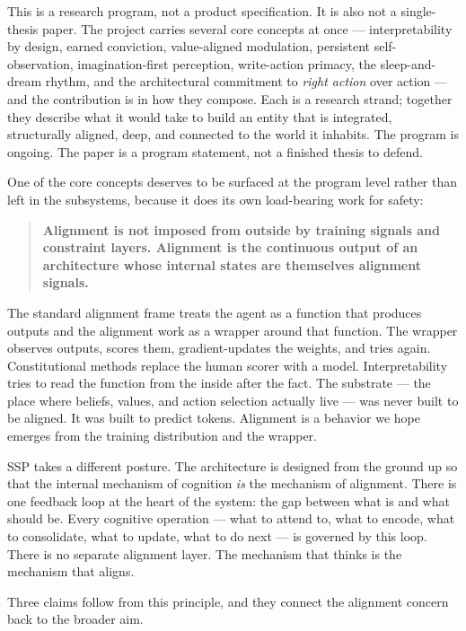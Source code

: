 \documentclass[12pt]{article}
\begin{document}
This is a research program, not a product specification. It is also not a single-thesis paper. The project carries several core concepts at once --- interpretability by design, earned conviction, value-aligned modulation, persistent self-observation, imagination-first perception, write-action primacy, the sleep-and-dream rhythm, and the architectural commitment to \emph{right action} over action --- and the contribution is in how they compose. Each is a research strand; together they describe what it would take to build an entity that is integrated, structurally aligned, deep, and connected to the world it inhabits. The program is ongoing. The paper is a program statement, not a finished thesis to defend.

One of the core concepts deserves to be surfaced at the program level rather than left in the subsystems, because it does its own load-bearing work for safety:

\begin{quote}
\textbf{Alignment is not imposed from outside by training signals and constraint layers. Alignment is the continuous output of an architecture whose internal states are themselves alignment signals.}
\end{quote}

The standard alignment frame treats the agent as a function that produces outputs and the alignment work as a wrapper around that function. The wrapper observes outputs, scores them, gradient-updates the weights, and tries again. Constitutional methods replace the human scorer with a model. Interpretability tries to read the function from the inside after the fact. The substrate --- the place where beliefs, values, and action selection actually live --- was never built to be aligned. It was built to predict tokens. Alignment is a behavior we hope emerges from the training distribution and the wrapper.

SSP takes a different posture. The architecture is designed from the ground up so that the internal mechanism of cognition \emph{is} the mechanism of alignment. There is one feedback loop at the heart of the system: the gap between what is and what should be. Every cognitive operation --- what to attend to, what to encode, what to consolidate, what to update, what to do next --- is governed by this loop. There is no separate alignment layer. The mechanism that thinks is the mechanism that aligns.

Three claims follow from this principle, and they connect the alignment concern back to the broader aim.
\end{document}
